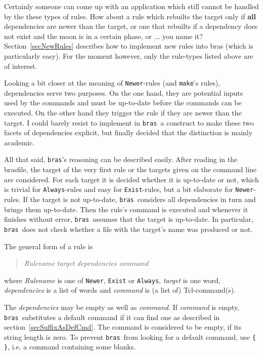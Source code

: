 \documentclass[12pt]{article}
\newcommand{\bras}{\texttt{bras}}
\newcommand{\make}{\texttt{make}}
\begin{document}
Certainly someone can come up with an application which still cannot be
handled by the these types of rules. How about a rule which rebuilts
the target only if \textbf{all} dependencies are newer than the
target, or one that rebuilts if a dependency does not exist and the
moon is in a certain phase, or $\ldots$ you name it?
Section~\ref{secNewRules} describes how to implement new rules into
bras (which is particularly easy). For the moment however, only the
rule-types listed above are of interest. 

Looking a bit closer at the meaning of \texttt{Newer}-rules (and
\make's rules), dependencies serve two purposes. On the one hand, they
are potential inputs used by the commands and must be up-to-date
before the commands can be executed. On the other hand they trigger
the rule if they are newer than the target. I could barely resist to
implement in \bras\ a construct to make these two facets of
dependencies explicit, but finally decided that the distinction is
mainly academic.

All that said, \bras's reasoning can be described easily.  After
reading in the brasfile, the target of the very first rule or the
targets given on the command line are considered. For each target it
is decided whether it is up-to-date or not, which is trivial for
\texttt{Always}-rules and easy for \texttt{Exist}-rules, but a bit
elaborate for \texttt{Newer}-rules. If the target is not up-to-date,
\bras\ considers all dependencies in turn and brings them
up-to-date. Then the rule's command is executed and whenever it
finishes without error, \bras\ assumes that the target is
up-to-date. In particular, \bras\ does not check whether a file with
the target's name was produced or not.

The general form of a rule is
\begin{quote}
\textit{Rulename} \textit{target} \textit{dependencies} \textit{command}
\end{quote}
where \textit{Rulename} is one of \texttt{Newer}, \texttt{Exist} or
\texttt{Always}, \textit{target} is one word, \textit{dependencies} is
a list of words and \textit{command} is (a list of) Tcl-command(s).

The \textit{dependencies} may be empty as well as \textit{command}. If
\textit{command} is empty, \bras\ substitutes a default command if it
can find one as described in section~\ref{secSuffixAsDefCmd}. The
command is considered to be empty, if its string length is zero. To
prevent \bras\ from looking for a default command, use \verb|{ }|,
i.e. a command containing some blanks.
\end{document}
